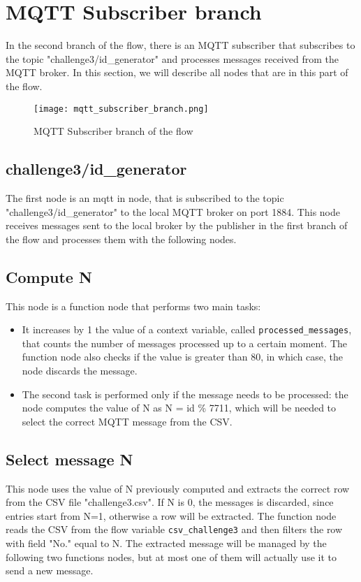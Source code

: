 \section{MQTT Subscriber branch}
\label{sec:subscriber_branch}

In the second branch of the flow, there is an MQTT subscriber that subscribes to the topic "challenge3/id\_generator" and processes messages received from the MQTT broker. In this section, we will describe all nodes that are in this part of the flow.

\begin{figure}[H]
    \centering
    \texttt{[image: mqtt\_subscriber\_branch.png]}
    \caption{MQTT Subscriber branch of the flow}
\end{figure}

\subsection{challenge3/id\_generator}
The first node is an mqtt in node, that is subscribed to the topic "challenge3/id\_generator" to the local MQTT broker on port 1884. This node receives messages sent to the local broker by the publisher in the first branch of the flow and processes them with the following nodes.

\subsection{Compute N}
This node is a function node that performs two main tasks:
\begin{itemize}
\item It increases by 1 the value of a context variable, called \verb|processed_messages|, that counts the number of messages processed up to a certain moment. The function node also checks if the value is greater than 80, in which case, the node discards the message.
\item The second task is performed only if the message needs to be processed: the node computes the value of N as N = id \% 7711, which will be needed to select the correct MQTT message from the CSV.
\end{itemize}

\subsection{Select message N}
This node uses the value of N previously computed and extracts the correct row from the CSV file "challenge3.csv". If N is 0, the messages is discarded, since entries start from N=1, otherwise a row will be extracted. The function node reads the CSV from the flow variable \verb|csv_challenge3| and then filters the row with field "No." equal to N. The extracted message will be managed by the following two functions nodes, but at most one of them will actually use it to send a new message.

